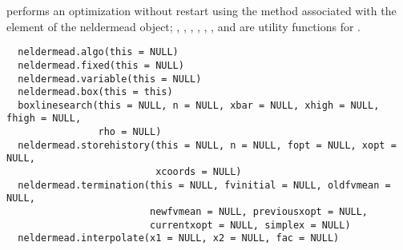 %
\begin{Description}\relax
{} performs an optimization without restart using the
method associated with the  element of the neldermead object;
, , ,
, ,
, and  are utility
functions for .
\end{Description}
%
\begin{Usage}
\begin{verbatim}
  neldermead.algo(this = NULL)
  neldermead.fixed(this = NULL)
  neldermead.variable(this = NULL)
  neldermead.box(this = this)
  boxlinesearch(this = NULL, n = NULL, xbar = NULL, xhigh = NULL, fhigh = NULL,
                rho = NULL)
  neldermead.storehistory(this = NULL, n = NULL, fopt = NULL, xopt = NULL,
                          xcoords = NULL)
  neldermead.termination(this = NULL, fvinitial = NULL, oldfvmean = NULL,
                         newfvmean = NULL, previousxopt = NULL,
                         currentxopt = NULL, simplex = NULL)
  neldermead.interpolate(x1 = NULL, x2 = NULL, fac = NULL)
\end{verbatim}
\end{Usage}
%
